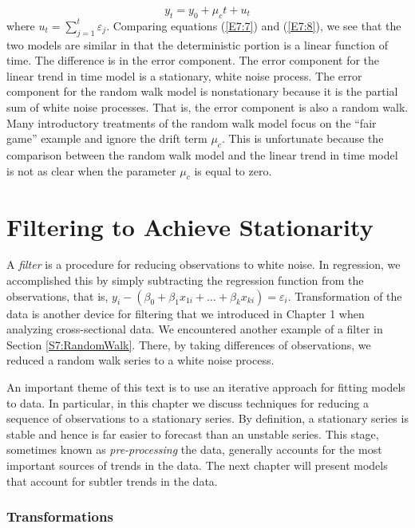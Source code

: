 \begin{equation} \label{E7:8}
y_t = y_0 + \mu_c t + u_t
\end{equation}
where $u_t = \sum_{j=1}^{t} \varepsilon_j$. Comparing equations
(\ref{E7:7}) and (\ref{E7:8}), we see that the two models are
similar in that the deterministic portion is a linear function of
time. The difference is in the error component. The error component
for the linear trend in time model is a stationary, white noise
process. The error component for the random walk model is
nonstationary because it is the partial sum of white noise
processes. That is, the error component is also a random walk. Many
introductory treatments of the random walk model focus on the ``fair
game'' example and ignore the drift term $\mu_c$. This is
unfortunate because the comparison between the random walk model and
the linear trend in time model is not as clear when the parameter
$\mu_c$ is equal to zero.

\section{Filtering to Achieve Stationarity}


A \emph{filter} is a procedure for reducing observations to white
noise. In regression, we accomplished this by simply subtracting the
regression function from the observations, that is, $y_i - (\beta_0
+ \beta_1 x_{1i} + \ldots + \beta_k x_{ki})=\varepsilon_i$.
Transformation of the data is another device for filtering that we
introduced in Chapter 1 when analyzing cross-sectional data. We
encountered another example of a filter in Section
\ref{S7:RandomWalk}. There, by taking differences of observations,
we reduced a random walk series to a white noise process.


An important theme of this text is to use an iterative approach for
fitting models to data. In particular, in this chapter we discuss
techniques for reducing a sequence of observations to a stationary
series. By definition, a stationary series is stable and hence is
far easier to forecast than an unstable series. This stage,
sometimes known as \emph{pre-processing} the data, generally
accounts for the most important sources of trends in the data. The
next chapter will present models that account for subtler trends in
the data.

\subsubsection*{Transformations}

